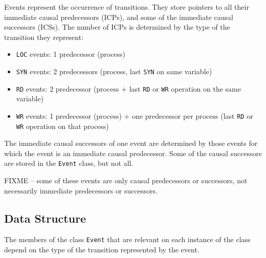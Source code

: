 \documentclass{llncs}
\begin{document}
Events represent the occurrence of transitions.
They store pointers to all their immediate causal predecessors (ICPs), and some of
the immediate causal successors (ICSs).
The number of ICPs is determined by the type of the transition they
represent:

\begin{itemize}
\item \verb!LOC! events: 1 predecessor (process)
\item \verb!SYN! events: 2 predecessors (process, last \verb!SYN! on same variable)
\item \verb!RD!  events: 2 predecessor (process + last \verb!RD! or
	\verb!WR! operation on the same variable)
\item \verb!WR!  events: 1 predecessor (process) + one predecessor per
	process (last \verb!RD! or \verb!WR! operation on that process)
\end{itemize}

The immediate causal successors of one event are determined by those events
for which the event is an immediate causal predecessor. Some of the causal
successors are stored in the \verb!Event! class, but not all.

FIXME -- some of these events are only causal predecessors or successors,
not necessarily immediate predecessors or successors.

\subsection{Data Structure}

The members of the class \verb!Event! that are relevant on each instance of
the class depend on the type of the transition represented by the event.
\end{document}
